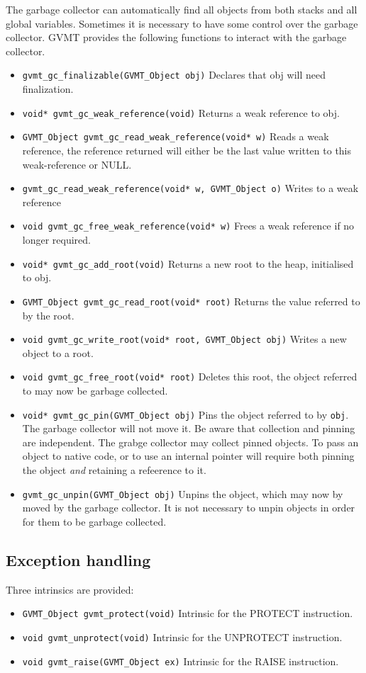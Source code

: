 The garbage collector can automatically find all objects from both stacks and all global variables. Sometimes it is necessary to have some control over the garbage collector.
GVMT provides the following functions to interact with the garbage collector.
\begin{itemize}
\item \verb|gvmt_gc_finalizable(GVMT_Object obj)| Declares that obj will need finalization.
\item \verb|void* gvmt_gc_weak_reference(void)| Returns a weak reference to obj.
\item \verb|GVMT_Object gvmt_gc_read_weak_reference(void* w)| Reads a weak reference, the reference returned will either be the last value written to this weak-reference or NULL.
\item \verb|gvmt_gc_read_weak_reference(void* w, GVMT_Object o)| Writes to a weak reference
\item \verb|void gvmt_gc_free_weak_reference(void* w)| Frees a weak reference if no longer required.
\item \verb|void* gvmt_gc_add_root(void)| Returns a new root to the heap, initialised to obj.
\item \verb|GVMT_Object gvmt_gc_read_root(void* root)| Returns the value referred to by the root.
\item \verb|void gvmt_gc_write_root(void* root, GVMT_Object obj)| Writes a new object to a root.
\item \verb|void gvmt_gc_free_root(void* root)| Deletes this root, the object referred to may now be garbage collected.

\item \verb|void* gvmt_gc_pin(GVMT_Object obj)| Pins the object referred to by \verb|obj|. The garbage collector will not move it. Be aware that collection and pinning are independent. The grabge collector may collect pinned objects. To pass an object to native code, or to use an internal pointer will require both pinning the object \emph{and} retaining a refeerence to it.
\item \verb|gvmt_gc_unpin(GVMT_Object obj)| Unpins the object, which may now by moved by the garbage collector. It is not necessary to unpin objects in order for them to be garbage collected.

\end{itemize}

\subsection{Exception handling\label{sect:user-except}}
Three intrinsics are provided:
\begin{itemize}
\item \verb|GVMT_Object gvmt_protect(void)| Intrinsic for the PROTECT instruction.
\item \verb|void gvmt_unprotect(void)| Intrinsic for the UNPROTECT instruction.
\item \verb|void gvmt_raise(GVMT_Object ex)| Intrinsic for the RAISE instruction.
\end{itemize}

